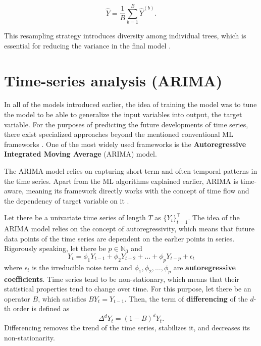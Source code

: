 \begin{equation*}
    \hat{Y} = \frac{1}{B}\sum_{b=1}^{B} \hat{Y}^{(b)}.
\end{equation*}

This resampling strategy introduces diversity among individual trees, which is essential for reducing the variance in the final model \cite{islp, skiena}.

\section{Time-series analysis (ARIMA)}
\label{sub:arima}

In all of the models introduced earlier, the idea of training the model was to tune the model to
be able to generalize the input variables into output, the target variable. For the purposes of predicting 
the future developments of time series, there exist specialized approaches beyond the mentioned conventional ML
frameworks \cite{forecast_book}. One of the most widely used frameworks is the \textbf{Autoregressive Integrated Moving Average} (ARIMA) model.

The ARIMA model relies on capturing short-term and often temporal patterns in the time series. Apart from the ML algorithms explained earlier, 
ARIMA is time-aware, meaning its framework directly works with the concept of time flow and the dependency of target variable on it \cite{forecast_book}. 

Let there be a univariate time series of length $T$ as $\{Y_t\}_{t=1}^{\top}$. The idea of the ARIMA model relies on the concept of autoregressivity, which means
that future data points of the time series are dependent on the earlier points in series. Rigorously speaking, let there be $p \in \mathbb{N}_0$ and
\begin{equation}
    \label{eq:ARIMA1}
    Y_t = \phi_1 Y_{t-1} + \phi_2 Y_{t-2} + \ldots + \phi_{p} Y_{t-p} + \epsilon_t
\end{equation}
where $\epsilon_t$ is the irreducible noise term and $\phi_1, \phi_2, \ldots, \phi_p$ are \textbf{autoregressive coefficients}. Time series tend to be non-stationary, which means that their statistical properties tend 
to change over time. For this purpose, let there be an operator $B$, which satisfies $B Y_t = Y_{t-1}$. Then, the term of \textbf{differencing} of the $d$-th order is defined as
\begin{equation}
    \label{eq:ARIMA2}
    \Delta^d Y_t=(1-B)^d Y_t.
\end{equation}
Differencing removes the trend of the time series, stabilizes it, and decreases its non-stationarity.

